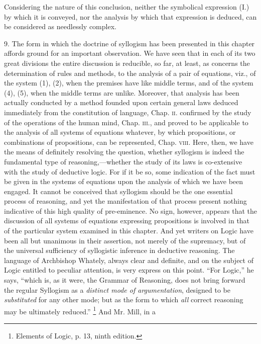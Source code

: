 \documentclass[oneside]{book}
\begin{document}
Considering the nature of this conclusion, neither the symbolical expression (I.) by which it is conveyed, nor the analysis
by which that expression is deduced, can be considered as needlessly complex.

9. The form in which the doctrine of syllogism has been
presented in this chapter affords ground for an important observation. We have seen that in each of its two great divisions the
entire discussion is reducible, so far, at least, as concerns the determination of rules and methods, to the analysis of a pair of
equations, viz., of the system (1), (2), when the premises have
like middle terms, and of the system (4), (5), when the middle
terms are unlike. Moreover, that analysis has been actually
conducted by a method founded upon certain general laws deduced immediately from the constitution of language, Chap. \textsc{ii.}
confirmed by the study of the operations of the human mind,
Chap. \textsc{iii.}, and proved to be applicable to the analysis of all systems of equations whatever, by which propositions, or combinations of propositions, can be represented, Chap. \textsc{viii}. Here, then,
we have the means of definitely resolving the question, whether
syllogism is indeed the fundamental type of reasoning,---whether
the study of its laws is co-extensive with the study of deductive
logic. For if it be so, some indication of the fact must be given
in the systems of equations upon the analysis of which we have
been engaged. It cannot be conceived that syllogism should be
the one essential process of reasoning, and yet the manifestation
of that process present nothing indicative of this high quality of
pre-eminence. No sign, however, appears that the discussion of
all systems of equations expressing propositions is involved in
that of the particular system examined in this chapter. And yet
writers on Logic have been all but unanimous in their assertion,
not merely of the supremacy, but of the universal sufficiency of
syllogistic inference in deductive reasoning. The language of
Archbishop Whately, always clear and definite, and on the subject
of Logic entitled to peculiar attention, is very express on
this point.  ``For Logic,'' he says, ``which is, as it were, the
Grammar of Reasoning, does not bring forward the regular Syllogism
as a \textit{distinct mode of argumentation}, designed to be \textit{substituted}
for any other mode; but as the form to which \textit{all} correct
reasoning may be ultimately reduced.''%
\footnote{Elements of Logic, p. 13, ninth edition.} And Mr. Mill, in a
\end{document}
